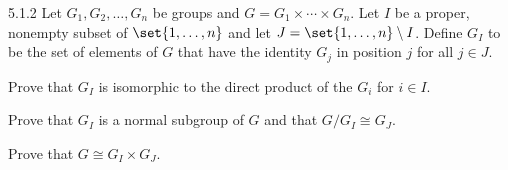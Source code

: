 \begin{exercise}{5.1.2}
    Let $G_1, G_2, \ldots, G_n$ be groups and $G = G_1 \times \cdots \times G_n$.
	Let $I$ be a proper, nonempty subset of $\set{1, \ldots, n}$ and let $J = \set{1, \ldots, n} \setminus I$.
	Define $G_I$ to be the set of elements of $G$ that have the identity $G_j$ in position $j$ for all $j \in J$.
    \begin{subexercises}
        \item Prove that $G_I$ is isomorphic to the direct product of the $G_i$ for $i \in I$.
        \item Prove that $G_I$ is a normal subgroup of $G$ and that $G/G_I \cong G_J$.
        \item Prove that $G \cong G_I \times G_J$.
    \end{subexercises}
\end{exercise}

